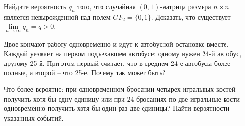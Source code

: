 \begin{problem}\Star
Найдите вероятность $q_n$ того, что случайная $(0,1)$-матрица размера $n\times n$ является невырожденной над полем 
$GF_2=\{ 0,1\}$. Доказать, что существует $\lim\limits_{n\to\infty} q_n=q>0$. 
\end{problem}


\begin{comment}
\begin{problem}
В самолете $n$ мест. Есть $n$ пассажиров, выстроившихся друг за другом в очередь. Во главе очереди -- <<заяц>>. У всех, 
кроме <<зайца>>, есть билет, на котором указан номер посадочного места. Так как <<заяц>> входит первым, он случайным образом занимает 
некоторое место. Каждый следующий пассажир, входящий в салон самолета, действует по такому принципу: если его место свободно, то 
садится на него, если занято, то занимает с равной вероятностью любое свободное. Найдите вероятность того, что последний пассажир 
сядет на свое место. 
\end{problem}
\end{comment}


\begin{problem} Двое кончают работу 
одновременно и идут к автобусной остановке вместе. Каждый уезжает на первом 
подъехавшем автобусе: одному нужен 24-й автобус, другому 25-й. При этом 
первый считает, что в среднем 24-е автобусы более полные, а второй -- что 
25-е. Почему так может быть?
\end{problem}

\begin{problem} 
Что более вероятно: при одновременном бросании четырех игральных костей получить хотя бы одну единицу или при $24$ бросаниях 
по две игральные кости одновременно получить хотя бы один раз две единицы? Найти вероятности указанных событий. 
\end{problem}


